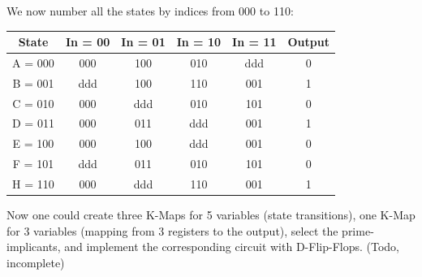 \documentclass[10pt,a4paper]{scrartcl}
\newcommand{\subExercise}[1]{\vspace{0.5em} \noindent{\bf #1)}}
\begin{document}
\subExercise{b} We now number all the states by indices from 000 to 110:

\begin{tabular}{|c|c|c|c|c|c|}
  \hline
  State & In = 00 & In = 01 & In = 10 & In = 11 & Output \\
  \hline
  A = 000 & 000 & 100 & 010 & ddd & 0 \\
  B = 001 & ddd & 100 & 110 & 001 & 1 \\
  C = 010 & 000 & ddd & 010 & 101 & 0 \\
  D = 011 & 000 & 011 & ddd & 001 & 1 \\
  E = 100 & 000 & 100 & ddd & 001 & 0 \\
  F = 101 & ddd & 011 & 010 & 101 & 0 \\
  H = 110 & 000 & ddd & 110 & 001 & 1 \\
  \hline
\end{tabular}

Now one could create three K-Maps for 5 variables (state transitions), 
one K-Map for 3 variables (mapping from 3 registers to the output), 
select the prime-implicants, and 
implement the corresponding circuit with D-Flip-Flops. (Todo, incomplete)
\end{document}
